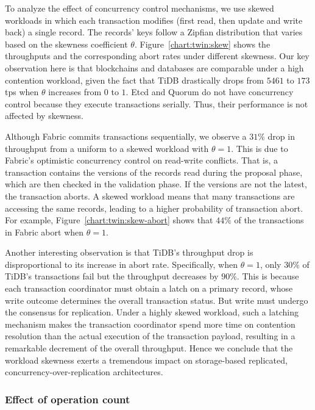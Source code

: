 To analyze the effect of concurrency control mechanisms, we use skewed workloads
in which each transaction modifies (first read, then update and write back) a
single record.
The records' keys follow a Zipfian distribution that varies based on the
skewness coefficient $\theta$.
Figure~\ref{chart:twin:skew} shows the throughputs and the corresponding abort rates
under different skewness.
Our key observation here is that blockchains and databases are comparable under
a high contention workload, given the fact that TiDB drastically drops from
$5461$ to $173$ tps when $\theta$ increases from $0$ to $1$.
Etcd and Quorum do not have concurrency control because they execute
transactions serially. Thus, their performance is not affected by skewness.

Although Fabric commits transactions sequentially, we observe a $31\%$ drop in
throughput from a uniform to a skewed workload with $\theta=1$.
This is due to Fabric's optimistic concurrency control on read-write conflicts.
That is, a transaction contains the versions of the records read during the
proposal phase, which are then checked in the validation phase.
If the versions are not the latest, the transaction aborts.
A skewed workload means that many transactions are accessing the same records,
leading to a higher probability of transaction abort.
For example, Figure~\ref{chart:twin:skew-abort} shows that $44\%$ of the transactions
in Fabric abort when $\theta=1$.

Another interesting observation is that TiDB's throughput drop is
disproportional to its increase in abort rate.
Specifically, when $\theta=1$, only $30\%$ of TiDB's transactions fail but the
throughput decreases by $90\%$.
This is because each transaction coordinator must obtain a latch on a primary
record, whose write outcome determines the overall transaction status.
But write must undergo the consensus for replication.
Under a highly skewed workload, such a latching mechanism makes the transaction
coordinator spend more time on contention resolution than the actual execution
of the transaction payload, resulting in a remarkable decrement of the overall
throughput.
Hence we conclude that the workload skewness exerts a tremendous impact on
storage-based replicated, concurrency-over-replication architectures.

\subsubsection{Effect of operation count}

